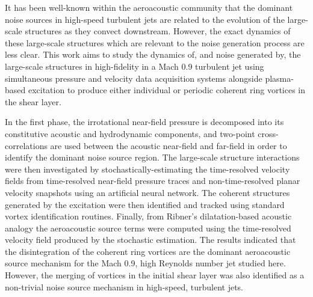It has been well-known within the aeroacoustic community that the dominant noise sources in high-speed turbulent jets are related to the evolution of the large-scale structures as they convect downstream.
However, the exact dynamics of these large-scale structures which are relevant to the noise generation process are less clear.
This work aims to study the dynamics of, and noise generated by, the large-scale structures in high-fidelity in a Mach 0.9 turbulent jet using simultaneous pressure and velocity data acquisition systems alongside plasma-based excitation to produce either individual or periodic coherent ring vortices in the shear layer.

In the first phase, the irrotational near-field pressure is decomposed into its constitutive acoustic and hydrodynamic components, and two-point cross-correlations are used between the acoustic near-field and far-field in order to identify the dominant noise source region.
The large-scale structure interactions were then investigated by stochastically-estimating the time-resolved velocity fields from time-resolved near-field pressure traces and non-time-resolved planar velocity snapshots using an artificial neural network.
The coherent structures generated by the excitation were then identified and tracked using standard vortex identification routines.
Finally, from Ribner's dilatation-based acoustic analogy the aeroacoustic source terms were computed using the time-resolved velocity field produced by the stochastic estimation.
The results indicated that the disintegration of the coherent ring vortices are the dominant aeroacoustic source mechanism for the Mach 0.9, high Reynolds number jet studied here. 
However, the merging of vortices in the initial shear layer was also identified as a non-trivial noise source mechanism in high-speed, turbulent jets. 